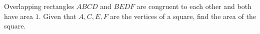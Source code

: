 Overlapping rectangles $ABCD$ and $BEDF$ are congruent to each other and both have area $1$. Given that $A,C,E, F$ are the vertices of a square, find the area of the square.
